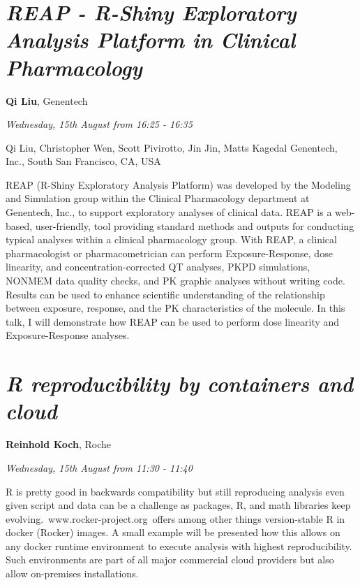 \documentclass[]{book}
\theoremstyle{definition}
\theoremstyle{definition}
\theoremstyle{definition}
\theoremstyle{remark}
\begin{document}
\hypertarget{reap---r-shiny-exploratory-analysis-platform-in-clinical-pharmacology}{%
\section{\texorpdfstring{\emph{REAP - R-Shiny Exploratory Analysis
Platform in Clinical
Pharmacology}}{REAP - R-Shiny Exploratory Analysis Platform in Clinical Pharmacology}}\label{reap---r-shiny-exploratory-analysis-platform-in-clinical-pharmacology}}

\textbf{Qi Liu}, Genentech

\emph{Wednesday, 15th August from 16:25 - 16:35}

Qi Liu, Christopher Wen, Scott Pivirotto, Jin Jin, Matts Kagedal
Genentech, Inc., South San Francisco, CA, USA

REAP (R-Shiny Exploratory Analysis Platform) was developed by the
Modeling and Simulation group within the Clinical Pharmacology
department at Genentech, Inc., to support exploratory analyses of
clinical data. REAP is a web-based, user-friendly, tool providing
standard methods and outputs for conducting typical analyses within a
clinical pharmacology group. With REAP, a clinical pharmacologist or
pharmacometrician can perform Exposure-Response, dose linearity, and
concentration-corrected QT analyses, PKPD simulations, NONMEM data
quality checks, and PK graphic analyses without writing code. Results
can be used to enhance scientific understanding of the relationship
between exposure, response, and the PK characteristics of the molecule.
In this talk, I will demonstrate how REAP can be used to perform dose
linearity and Exposure-Response analyses.

\hypertarget{r-reproducibility-by-containers-and-cloud}{%
\section{\texorpdfstring{\emph{R reproducibility by containers and
cloud}}{R reproducibility by containers and cloud}}\label{r-reproducibility-by-containers-and-cloud}}

\textbf{Reinhold Koch}, Roche

\emph{Wednesday, 15th August from 11:30 - 11:40}

R is pretty good in backwards compatibility but still reproducing
analysis even given script and data can be a challenge as packages, R,
and math libraries keep evolving.~www.rocker-project.org~offers among
other things version-stable R in docker (Rocker) images. A small example
will be presented how this allows on any docker runtime environment to
execute analysis with highest reproducibility. Such environments are
part of all major commercial cloud providers but also allow on-premises
installations.
\end{document}
